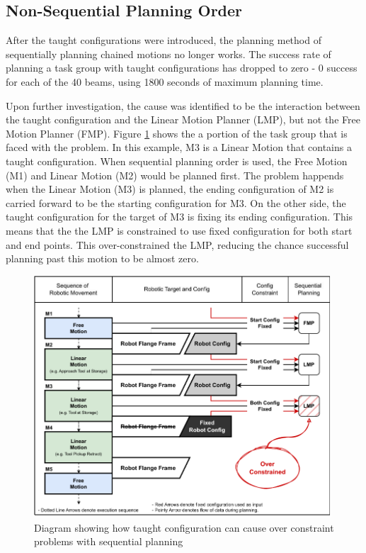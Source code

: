 \subsection{Non-Sequential Planning Order}
\label{subsection:exploration-3-non-sequential-planning-order}

After the taught configurations were introduced, the planning method of sequentially planning chained motions no longer works. The success rate of planning a task group with taught configurations has dropped to zero - 0 success for each of the 40 beams, using 1800 seconds of maximum planning time.

Upon further investigation, the cause was identified to be the interaction between the taught configuration and the Linear Motion Planner (LMP), but not the Free Motion Planner (FMP). Figure \ref{fig:taught-configurations-over-constraint} shows the a portion of the task group that is faced with the problem. In this example, M3 is a Linear Motion that contains a taught configuration. When sequential planning order is used, the Free Motion (M1) and Linear Motion (M2) would be planned first. The problem happends when the Linear Motion (M3) is planned, the ending configuration of M2 is carried forward to be the starting configuration for M3. On the other side, the taught configuration for the target of M3 is fixing its ending configuration. This means that the the LMP is constrained to use fixed configuration for both start and end points. This over-constrained the LMP, reducing the chance successful planning past this motion to be almost zero.

\begin{figure}[!h]
    \centering
    \includegraphics[width=0.99\textwidth]{images/6a/image5.pdf}
    \caption{Diagram showing how taught configuration can cause over constraint problems with sequential planning}
    \label{fig:taught-configurations-over-constraint}
\end{figure}

